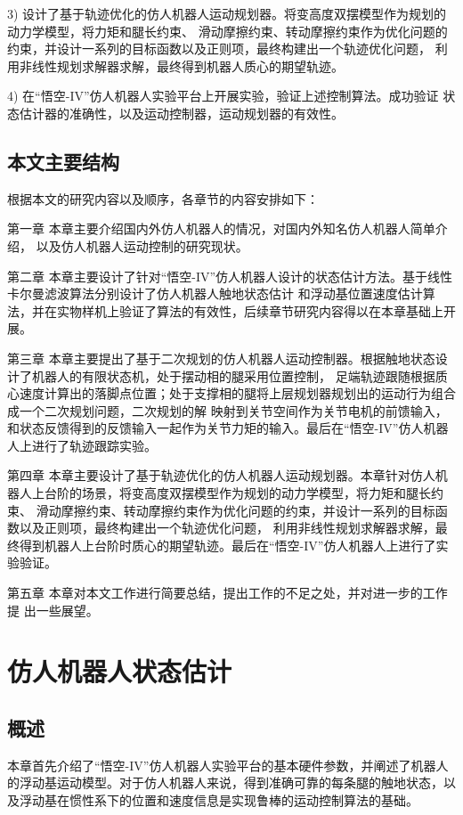 3) 设计了基于轨迹优化的仿人机器人运动规划器。将变高度双摆模型作为规划的动力学模型，将力矩和腿长约束、
滑动摩擦约束、转动摩擦约束作为优化问题的约束，并设计一系列的目标函数以及正则项，最终构建出一个轨迹优化问题，
利用非线性规划求解器求解，最终得到机器人质心的期望轨迹。

4) 在“悟空-IV”仿人机器人实验平台上开展实验，验证上述控制算法。成功验证
状态估计器的准确性，以及运动控制器，运动规划器的有效性。

\section{本文主要结构}
根据本文的研究内容以及顺序，各章节的内容安排如下：

第一章 本章主要介绍国内外仿人机器人的情况，对国内外知名仿人机器人简单介绍，
以及仿人机器人运动控制的研究现状。

第二章 本章主要设计了针对“悟空-IV”仿人机器人设计的状态估计方法。基于线性卡尔曼滤波算法分别设计了仿人机器人触地状态估计
和浮动基位置速度估计算法，并在实物样机上验证了算法的有效性，后续章节研究内容得以在本章基础上开展。

第三章 本章主要提出了基于二次规划的仿人机器人运动控制器。根据触地状态设计了机器人的有限状态机，处于摆动相的腿采用位置控制，
足端轨迹跟随根据质心速度计算出的落脚点位置；处于支撑相的腿将上层规划器规划出的运动行为组合成一个二次规划问题，二次规划的解
映射到关节空间作为关节电机的前馈输入，和状态反馈得到的反馈输入一起作为关节力矩的输入。最后在“悟空-IV”仿人机器人上进行了轨迹跟踪实验。

第四章 本章主要设计了基于轨迹优化的仿人机器人运动规划器。本章针对仿人机器人上台阶的场景，将变高度双摆模型作为规划的动力学模型，将力矩和腿长约束、
滑动摩擦约束、转动摩擦约束作为优化问题的约束，并设计一系列的目标函数以及正则项，最终构建出一个轨迹优化问题，
利用非线性规划求解器求解，最终得到机器人上台阶时质心的期望轨迹。最后在“悟空-IV”仿人机器人上进行了实验验证。

第五章 本章对本文工作进行简要总结，提出工作的不足之处，并对进一步的工作提
出一些展望。
\chapter{仿人机器人状态估计}

\section{概述}

本章首先介绍了“悟空-IV”仿人机器人实验平台的基本硬件参数，并阐述了机器人的浮动基运动模型。对于仿人机器人来说，得到准确可靠的每条腿的触地状态，以及浮动基在惯性系下的位置和速度信息是实现鲁棒的运动控制算法的基础。

